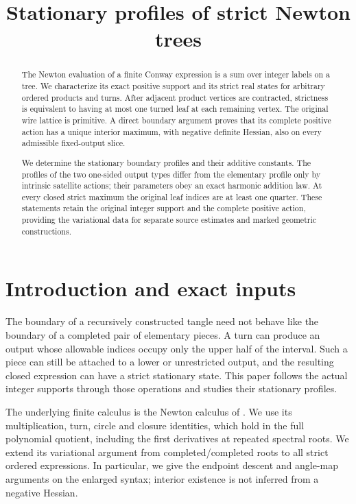 \documentclass[11pt]{article}
\title{Stationary profiles of strict Newton trees}
\author{}\date{}
\numberwithin{equation}{section}
\theoremstyle{definition}\newtheorem{definition}[theorem]{Definition}
\theoremstyle{remark}\newtheorem{remark}[theorem]{Remark}
\begin{document}
\maketitle
\begin{abstract}
The Newton evaluation of a finite Conway expression is a sum over
integer labels on a tree. We characterize its exact positive support
and its strict real states for arbitrary ordered products and turns.
After adjacent product vertices are contracted, strictness is
equivalent to having at most one turned leaf at each remaining
vertex. The original wire lattice is primitive. A direct boundary
argument proves that its complete positive action has a unique
interior maximum, with negative definite Hessian, also on every
admissible fixed-output slice.

We determine the stationary boundary profiles and their additive
constants. The profiles of the two one-sided output types differ
from the elementary profile only by intrinsic satellite actions;
their parameters obey an exact harmonic addition law. At every
closed strict maximum the original leaf indices are at least one
quarter. These statements retain the original integer support and
the complete positive action, providing the variational data for
separate source estimates and marked geometric constructions.
\end{abstract}

\section{Introduction and exact inputs}
The boundary of a recursively constructed tangle need not behave
like the boundary of a completed pair of elementary pieces. A turn
can produce an output whose allowable indices occupy only the upper
half of the interval. Such a piece can still be attached to a lower
or unrestricted output, and the resulting closed expression can
have a strict stationary state. This paper follows the actual
integer supports through those operations and studies their
stationary profiles.

The underlying finite calculus is the Newton calculus of
\cite{Newton}. We use its multiplication, turn, circle and closure
identities, which hold in the full polynomial quotient, including
the first derivatives at repeated spectral roots. We extend its
variational argument from completed/completed roots to all strict
ordered expressions. In particular, we give the endpoint descent
and angle-map arguments on the enlarged syntax; interior existence
is not inferred from a negative Hessian.
\end{document}
